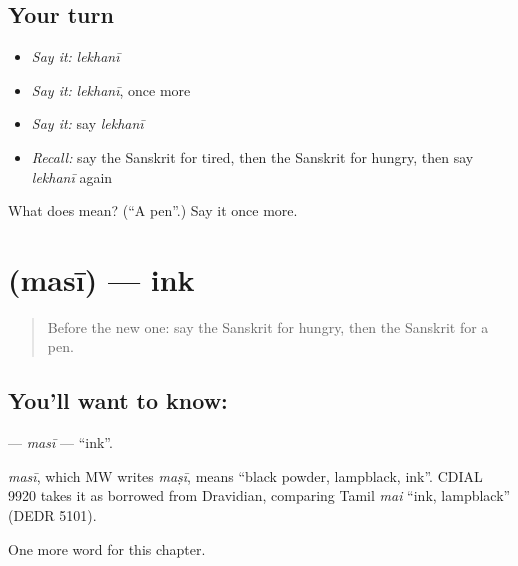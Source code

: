 \subsection*{Your turn}
\begin{itemize}
\raggedright
  \item \emph{Say it:} \emph{lekhanī}
  \item \emph{Say it:} \emph{lekhanī}, once more
  \item \emph{Say it:} say \emph{lekhanī}
  \item \emph{Recall:} say the Sanskrit for tired, then the Sanskrit for hungry, then say \emph{lekhanī} again
\end{itemize}

\begin{tcolorbox}[breakable,colback=teal!4,colframe=teal!35!black,title={Before you move on}]
What does  mean? (\textquotedblleft{}A pen\textquotedblright{}.) Say it once more.
\end{tcolorbox}
\section[\texorpdfstring{\sk{मसी} (masī)}{मसी (masī)}]{ (masī) — ink}

\label{lesson:SA-C158-masi}



\begin{quote}
Before the new one: say the Sanskrit for hungry, then the Sanskrit for a pen.
\end{quote}

\subsection*{You'll want to know: }
\textbf{} — \emph{masī} — \textquotedblleft{}ink\textquotedblright{}.

\begin{cousinweb}
\emph{masī}, which MW writes \emph{maṣī}, means \textquotedblleft{}black powder, lampblack, ink\textquotedblright{}. CDIAL 9920 takes it as borrowed from Dravidian, comparing Tamil \emph{mai} \textquotedblleft{}ink, lampblack\textquotedblright{} (DEDR 5101).
\end{cousinweb}

\begin{grammarlens}[title={What you've built}]
One more word for this chapter.
\end{grammarlens}

